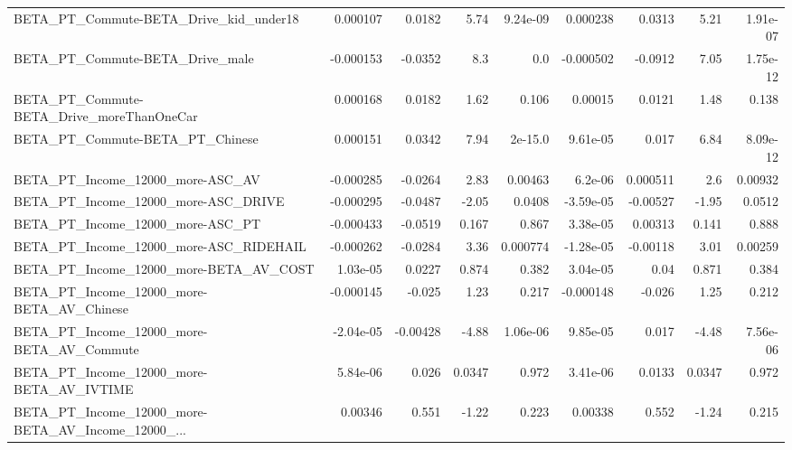 \begin{tabular}{lrrrrrrrr}
BETA\_PT\_Commute-BETA\_Drive\_kid\_under18             &    0.000107 &       0.0182 &      5.74 & 9.24e-09 &   0.000238 &      0.0313 &         5.21 &      1.91e-07 \\
BETA\_PT\_Commute-BETA\_Drive\_male                    &   -0.000153 &      -0.0352 &       8.3 &      0.0 &  -0.000502 &     -0.0912 &         7.05 &      1.75e-12 \\
BETA\_PT\_Commute-BETA\_Drive\_moreThanOneCar          &    0.000168 &       0.0182 &      1.62 &    0.106 &    0.00015 &      0.0121 &         1.48 &         0.138 \\
BETA\_PT\_Commute-BETA\_PT\_Chinese                    &    0.000151 &       0.0342 &      7.94 &  2e-15.0 &   9.61e-05 &       0.017 &         6.84 &      8.09e-12 \\
BETA\_PT\_Income\_12000\_more-ASC\_AV                   &   -0.000285 &      -0.0264 &      2.83 &  0.00463 &    6.2e-06 &    0.000511 &          2.6 &       0.00932 \\
BETA\_PT\_Income\_12000\_more-ASC\_DRIVE                &   -0.000295 &      -0.0487 &     -2.05 &   0.0408 &  -3.59e-05 &    -0.00527 &        -1.95 &        0.0512 \\
BETA\_PT\_Income\_12000\_more-ASC\_PT                   &   -0.000433 &      -0.0519 &     0.167 &    0.867 &   3.38e-05 &     0.00313 &        0.141 &         0.888 \\
BETA\_PT\_Income\_12000\_more-ASC\_RIDEHAIL             &   -0.000262 &      -0.0284 &      3.36 & 0.000774 &  -1.28e-05 &    -0.00118 &         3.01 &       0.00259 \\
BETA\_PT\_Income\_12000\_more-BETA\_AV\_COST             &    1.03e-05 &       0.0227 &     0.874 &    0.382 &   3.04e-05 &        0.04 &        0.871 &         0.384 \\
BETA\_PT\_Income\_12000\_more-BETA\_AV\_Chinese          &   -0.000145 &       -0.025 &      1.23 &    0.217 &  -0.000148 &      -0.026 &         1.25 &         0.212 \\
BETA\_PT\_Income\_12000\_more-BETA\_AV\_Commute          &   -2.04e-05 &     -0.00428 &     -4.88 & 1.06e-06 &   9.85e-05 &       0.017 &        -4.48 &      7.56e-06 \\
BETA\_PT\_Income\_12000\_more-BETA\_AV\_IVTIME           &    5.84e-06 &        0.026 &    0.0347 &    0.972 &   3.41e-06 &      0.0133 &       0.0347 &         0.972 \\
BETA\_PT\_Income\_12000\_more-BETA\_AV\_Income\_12000\_... &     0.00346 &        0.551 &     -1.22 &    0.223 &    0.00338 &       0.552 &        -1.24 &         0.215 \\

\end{tabular}
